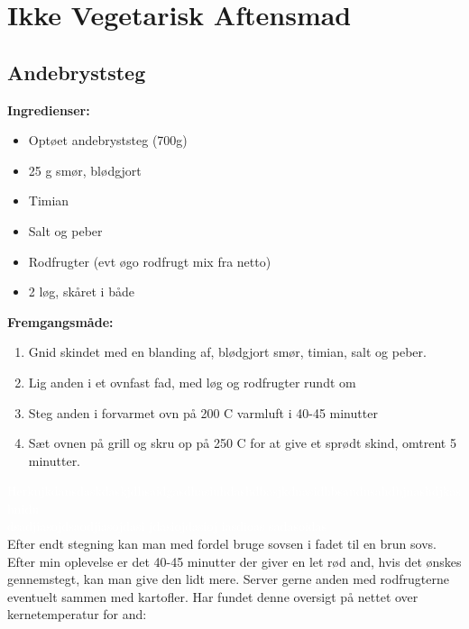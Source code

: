 \documentclass{book}
\begin{document}
\chapter{Ikke Vegetarisk Aftensmad} 
\minitoc
\newpage \section{Andebryststeg}
\begin{minipage}[t]{0.48\textwidth}
\textbf{Ingredienser:}
\begin{itemize}
    \item Optøet andebryststeg (700g)
    \item 25 g smør, blødgjort
    \item Timian
    \item Salt og peber
    \item Rodfrugter (evt øgo rodfrugt mix fra netto)
    \item 2 løg, skåret i både
\end{itemize}
\end{minipage}
\begin{minipage}[t]{0.48\textwidth}
\textbf{Fremgangsmåde:}
\begin{enumerate}
    \item Gnid skindet med en blanding af, blødgjort smør, timian, salt og peber.
    \item Lig anden i et ovnfast fad, med løg og rodfrugter rundt om
    \item Steg anden i forvarmet ovn på 200 \degree C varmluft i 40-45 minutter
    \item Sæt ovnen på grill og skru op på 250 \degree C for at give et sprødt skind, omtrent 5 minutter.
\end{enumerate}
\end{minipage}
\textcolor{white}{Herkujkdansdaskdaskjdhsaidgasdhasiuhdashdbasjkdnasidhbsandusahdbjnashdjkashnidu\\ dsadjiasojdsaodjiasojdasi jdasiojdasioj iasdioas sadasoidas \\}
Efter endt stegning kan man med fordel bruge sovsen i fadet til en brun sovs. Efter min oplevelse er det 40-45 minutter der giver en let rød and, hvis det ønskes gennemstegt, kan man give den lidt mere. Server gerne anden med rodfrugterne eventuelt sammen med kartofler.
Har fundet denne oversigt på nettet over kernetemperatur for and:
\end{document}
